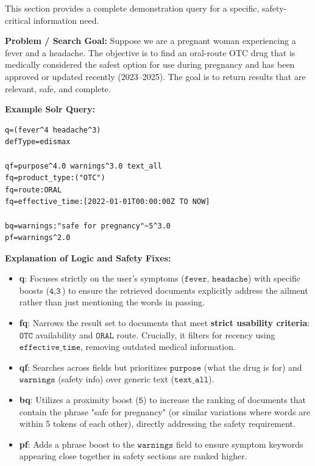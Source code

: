 This section provides a complete demonstration query for a specific, safety-critical information need.

\textbf{Problem / Search Goal:} Suppose we are a pregnant woman experiencing a fever and a headache. The objective is to find an oral-route OTC drug that is medically considered the safest option for use during pregnancy and has been approved or updated recently (2023–2025). The goal is to return results that are relevant, safe, and complete.

\textbf{Example Solr Query:}

\begin{verbatim}
q=(fever^4 headache^3)
defType=edismax

qf=purpose^4.0 warnings^3.0 text_all
fq=product_type:("OTC")
fq=route:ORAL
fq=effective_time:[2022-01-01T00:00:00Z TO NOW]

bq=warnings:"safe for pregnancy"~5^3.0
pf=warnings^2.0
\end{verbatim}

\textbf{Explanation of Logic and Safety Fixes:}
\begin{itemize}
    \item \textbf{q}: Focuses strictly on the user's symptoms ($\texttt{fever}$, $\texttt{headache}$) with specific boosts ($\texttt{\^{}4}, \texttt{\^{}3}$) to ensure the retrieved documents explicitly address the ailment rather than just mentioning the words in passing.
    \item \textbf{fq}: Narrows the result set to documents that meet \textbf{strict usability criteria}: $\texttt{OTC}$ availability and $\texttt{ORAL}$ route. Crucially, it filters for recency using $\texttt{effective\_time}$, removing outdated medical information.
    \item \textbf{qf}: Searches across fields but prioritizes $\texttt{purpose}$ (what the drug is for) and $\texttt{warnings}$ (safety info) over generic text ($\texttt{text\_all}$).
    \item \textbf{bq}: Utilizes a proximity boost ($\texttt{\~{}5}$) to increase the ranking of documents that contain the phrase "safe for pregnancy" (or similar variations where words are within 5 tokens of each other), directly addressing the safety requirement.
    \item \textbf{pf}: Adds a phrase boost to the $\texttt{warnings}$ field to ensure symptom keywords appearing close together in safety sections are ranked higher.
\end{itemize}

